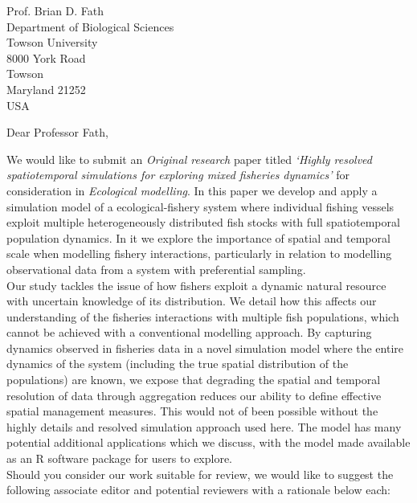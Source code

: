 \documentclass[12pt]{letter}
\begin{document}
\begin{letter}{Prof. Brian D. Fath \\ Department of Biological Sciences \\
		Towson University \\ 8000 York Road \\ Towson \\ Maryland 21252 \\ USA}
\opening{Dear Professor Fath,}

We would like to submit an \emph{Original research} paper titled \emph{`Highly
	resolved spatiotemporal simulations for exploring mixed fisheries
	dynamics'} for consideration in \emph{Ecological modelling}. In this
paper we develop and apply a simulation model of a ecological-fishery system
where individual fishing vessels exploit multiple heterogeneously distributed
fish stocks with full spatiotemporal population dynamics. In it we explore the
importance of spatial and temporal scale when modelling fishery interactions,
particularly in relation to modelling observational data from a system with
preferential sampling.\\

Our study tackles the issue of how fishers exploit a dynamic natural resource
with uncertain knowledge of its distribution. We detail how this affects our
understanding of the fisheries interactions with multiple fish populations,
which cannot be achieved with a conventional modelling approach. By capturing
dynamics observed in fisheries data in a novel simulation model where the
entire dynamics of the system (including the true spatial distribution of the
populations) are known, we expose that degrading the spatial and temporal
resolution of data through aggregation reduces our ability to define effective
spatial management measures. This would not of been possible without the highly
details and resolved simulation approach used here. The model has many
potential additional applications which we discuss, with the model made
available as an R software package for users to explore.\\

Should you consider our work suitable for review, we would like to suggest the
following associate editor and potential reviewers with a rationale below each:


\end{letter}
\end{document}
